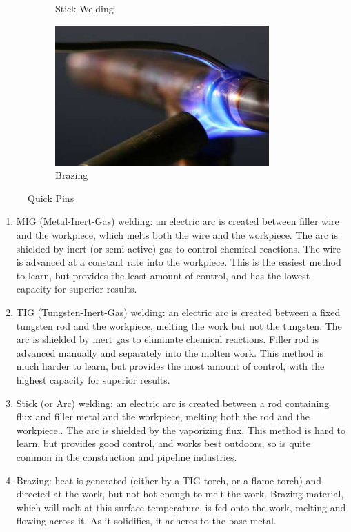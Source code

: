 \documentclass[10pt,letterpaper]{book}
\begin{document}
\begin{figure}[H]
\begin{subfigure}[b]{.24\linewidth}
			\caption{Stick Welding}
		\end{subfigure}\begin{subfigure}[b]{.24\linewidth}
			\includegraphics[width=0.9\textwidth]{imgs/braze.png}
			\caption{Brazing}
		\end{subfigure}
		\caption{Quick Pins}
	\end{figure}
 	
 	\begin{enumerate}[label=\alph*]
 		\item MIG (Metal-Inert-Gas) welding: an electric arc is created between filler wire and the workpiece, which melts both the wire and the workpiece. The arc is shielded by inert (or semi-active) gas to control chemical reactions. The wire is advanced at a constant rate into the workpiece. This is the easiest method to learn, but provides the least amount of control, and has the lowest capacity for superior results.
 		
 		\item TIG (Tungsten-Inert-Gas) welding: an electric arc is created between a fixed tungsten rod and the workpiece, melting the work but not the tungsten. The arc is shielded by inert gas to eliminate chemical reactions. Filler rod is advanced manually and separately into the molten work. This method is much harder to learn, but provides the most amount of control, with the highest capacity for superior results.
 		
 		\item Stick (or Arc) welding: an electric arc is created between a rod containing flux and filler metal and the workpiece, melting both the rod and the workpiece.. The arc is shielded by the vaporizing flux. This method is hard to learn, but provides good control, and works best outdoors, so is quite common in the construction and pipeline industries.
 		
 		\item Brazing: heat is generated (either by a TIG torch, or a flame torch) and directed at the work, but not hot enough to melt the work. Brazing material, which will melt at this surface temperature, is fed onto the work, melting and flowing across it. As it solidifies, it adheres to the base metal.
 		
 	\end{enumerate}
 		
\end{document}
